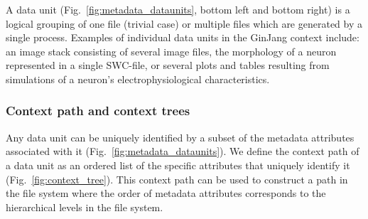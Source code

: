 \documentclass{frontiersSCNS} %
\begin{document}
A data unit (Fig.~\ref{fig:metadata_dataunits}, bottom left and bottom right)
is a logical grouping of one file (trivial case) or multiple files which are
generated by a single process. Examples of individual data units in the GinJang
context include: an image stack consisting of several image files, the
morphology of a neuron represented in a single SWC-file, or several plots and
tables resulting from simulations of a neuron's electrophysiological
characteristics.

\subsubsection{Context path and context trees}

Any data unit can be uniquely identified by a subset of the metadata attributes
associated with it (Fig.~\ref{fig:metadata_dataunits}). We define the context
path of a data unit as an ordered list of the specific attributes that uniquely
identify it (Fig.~\ref{fig:context_tree}). This context path can be used to
construct a path in the file system where the order of metadata attributes
corresponds to the hierarchical levels in the file system.
\end{document}
